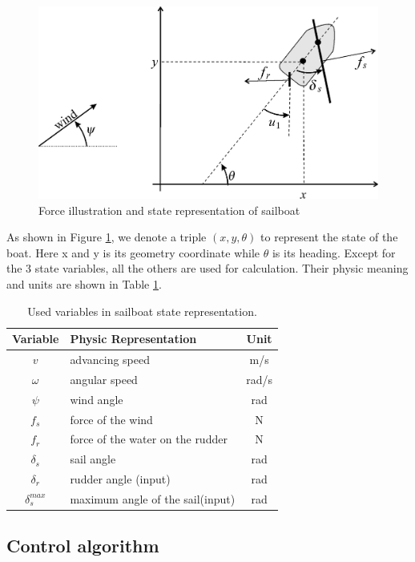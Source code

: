 \documentclass[a4paper]{report}
\begin{document}
\begin{figure}[H]
	\centering
	\includegraphics[width=0.6\linewidth]{image/state_representation.jpg}
	\caption{Force illustration and state representation of sailboat}
	\label{fig:state_repre}
\end{figure}



As shown in Figure \ref{fig:state_repre}, we denote a triple $(x, y, \theta)$ to represent the state of the boat. Here x and y is its geometry coordinate while $\theta$ is its heading. Except for the 3 state variables, all the others are used for calculation. Their physic meaning and units are shown in Table \ref{tab:used_var}.

\begin{table}[ht]
\centering
\caption{\label{tab:used_var}Used variables in sailboat state representation.}
\begin{tabular}{c|l|c}
\hline\hline
Variable & Physic Representation & Unit \\
\hline\hline
$v$ & advancing speed & m/s\\
$\omega$ & angular speed & rad/s \\
$\psi$ & wind angle &  rad \\
$f_s$ & force of the wind & N \\
$f_r$ & force of the water on the rudder & N \\
$\delta_s$ & sail angle & rad \\
$\delta_r$ & rudder angle (input) &  rad \\
$\delta_s^{max}$ & maximum angle of the sail(input) & rad\\

\hline\hline
\end{tabular}
\end{table}


\subsection{Control algorithm}
\end{document}
